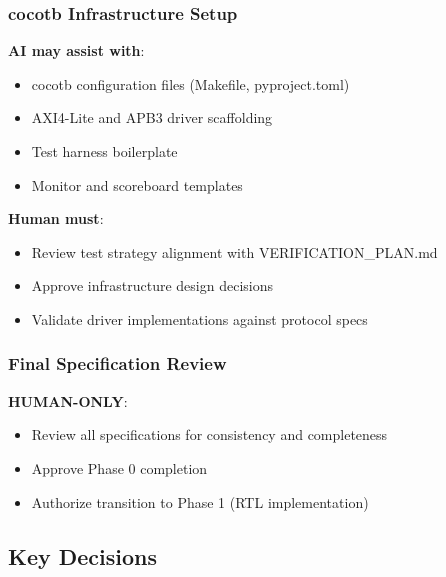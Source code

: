 \subsubsection{cocotb Infrastructure Setup}\label{cr:status:phase-status:cocotb-infrastructure-setup}

\begin{record}

\textbf{AI may assist with}:

\begin{itemize}
\tightlist
\item
  cocotb configuration files (Makefile, pyproject.toml)
\item
  AXI4-Lite and APB3 driver scaffolding
\item
  Test harness boilerplate
\item
  Monitor and scoreboard templates
\end{itemize}

\textbf{Human must}:

\begin{itemize}
\tightlist
\item
  Review test strategy alignment with VERIFICATION\_\allowbreak{}PLAN.md
\item
  Approve infrastructure design decisions
\item
  Validate driver implementations against protocol specs
\end{itemize}

\end{record}

\subsubsection{Final Specification Review}\label{cr:status:phase-status:final-specification-review}

\begin{record}

\textbf{HUMAN-ONLY}:

\begin{itemize}
\tightlist
\item
  Review all specifications for consistency and completeness
\item
  Approve Phase 0 completion
\item
  Authorize transition to Phase 1 (RTL implementation)
\end{itemize}

\end{record}

\subsection{Key Decisions}\label{cr:status:phase-status:key-decisions}

